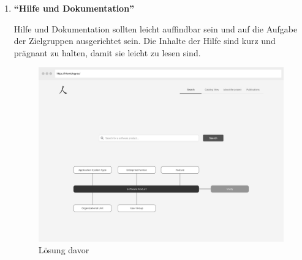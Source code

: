 \begin{enumerate}


\item \textbf{\enquote{Hilfe und Dokumentation}} \newline

Hilfe und Dokumentation sollten leicht auffindbar sein und auf die Aufgabe der Zielgruppen ausgerichtet sein. 
Die Inhalte der Hilfe sind kurz und prägnant zu halten, damit sie leicht zu lesen sind. 

\begin{figure}[H]
	\centering
    	\includegraphics[width=1.45\textwidth, angle=-90]{Images/Startseite}
   	\caption{Lösung davor}
\end{figure}

\clearpage



\end{enumerate}
